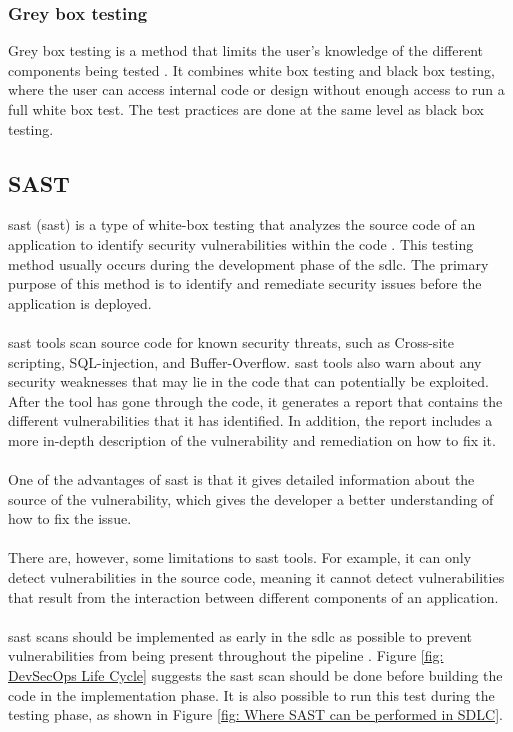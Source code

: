 \subsubsection{Grey box testing}
Grey box testing is a method that limits the user's knowledge of the different components being tested \cite{GreyBox}. It combines white box testing and black box testing, where the user can access internal code or design without enough access to run a full white box test. The test practices are done at the same level as black box testing. 

\subsection{SAST}
\acrlong{sast} (\acrshort{sast}) is a type of white-box testing that analyzes the source code of an application to identify security vulnerabilities within the code \cite{sast}. This testing method usually occurs during the development phase of the \acrlong{sdlc}. The primary purpose of this method is to identify and remediate security issues before the application is deployed. 
\\~\\
\acrshort{sast} tools scan source code for known security threats, such as \gls{Cross-site scripting}, \gls{SQL-injection}, and \gls{Buffer-Overflow}. \acrshort{sast} tools also warn about any security weaknesses that may lie in the code that can potentially be exploited. After the tool has gone through the code, it generates a report that contains the different vulnerabilities that it has identified. In addition, the report includes a more in-depth description of the vulnerability and remediation on how to fix it. 
\\~\\
One of the advantages of \acrshort{sast} is that it gives detailed information about the source of the vulnerability, which gives the developer a better understanding of how to fix the issue. 
\\~\\
There are, however, some limitations to \acrshort{sast} tools. For example, it can only detect vulnerabilities in the source code, meaning it cannot detect vulnerabilities that result from the interaction between different components of an application.
\\~\\
\acrshort{sast} scans should be implemented as early in the \acrshort{sdlc} as possible to prevent vulnerabilities from being present throughout the pipeline \cite{SASTplacement}. Figure \ref{fig: DevSecOps Life Cycle} suggests the \acrshort{sast} scan should be done before building the code in the implementation phase. It is also possible to run this test during the testing phase, as shown in Figure \ref{fig: Where SAST can be performed in SDLC}.

